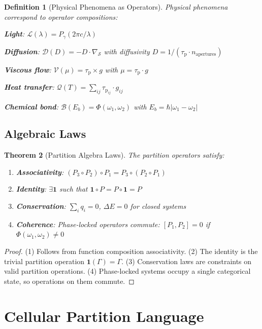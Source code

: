 \documentclass[aps,prd,twocolumn,superscriptaddress,floatfix,nofootinbib]{revtex4-2}
\newtheorem{theorem}{Theorem}[section]
\newtheorem{definition}[theorem]{Definition}
\theoremstyle{remark}
\newcommand{\Sspace}{\mathcal{S}}
\newcommand{\Pop}{P}
\newcommand{\Gstate}{\Gamma}
\newcommand{\taulag}{\tau_{\mathrm{p}}}
\begin{document}
\begin{definition}[Physical Phenomena as Operators]
\label{def:phenomena_ops}
Physical phenomena correspond to operator compositions:

\textbf{Light}: $\mathcal{L}(\lambda) = \Pop_\gamma(2\pi c/\lambda)$

\textbf{Diffusion}: $\mathcal{D}(D) = -D \cdot \nabla_{\Sspace}$ with diffusivity $D = 1/(\taulag \cdot n_{\text{apertures}})$

\textbf{Viscous flow}: $\mathcal{V}(\mu) = \taulag \times g$ with $\mu = \taulag \cdot g$

\textbf{Heat transfer}: $\mathcal{Q}(T) = \sum_{ij} \taulag_{ij} \cdot g_{ij}$

\textbf{Chemical bond}: $\mathcal{B}(E_b) = \Phi(\omega_1, \omega_2)$ with $E_b = \hbar|\omega_1 - \omega_2|$
\end{definition}

\subsection{Algebraic Laws}

\begin{theorem}[Partition Algebra Laws]
\label{thm:algebra_laws}
The partition operators satisfy:
\begin{enumerate}
\item \textbf{Associativity}: $(\Pop_3 \circ \Pop_2) \circ \Pop_1 = \Pop_3 \circ (\Pop_2 \circ \Pop_1)$
\item \textbf{Identity}: $\exists \mathbf{1}$ such that $\mathbf{1} \circ \Pop = \Pop \circ \mathbf{1} = \Pop$
\item \textbf{Conservation}: $\sum_i q_i = 0$, $\Delta E = 0$ for closed systems
\item \textbf{Coherence}: Phase-locked operators commute: $[\Pop_1, \Pop_2] = 0$ if $\Phi(\omega_1, \omega_2) \neq 0$
\end{enumerate}
\end{theorem}

\begin{proof}
(1) Follows from function composition associativity.
(2) The identity is the trivial partition operation $\mathbf{1}(\Gstate) = \Gstate$.
(3) Conservation laws are constraints on valid partition operations.
(4) Phase-locked systems occupy a single categorical state, so operations on them commute.
\end{proof}

\section{Cellular Partition Language}
\label{sec:language}
\end{document}

